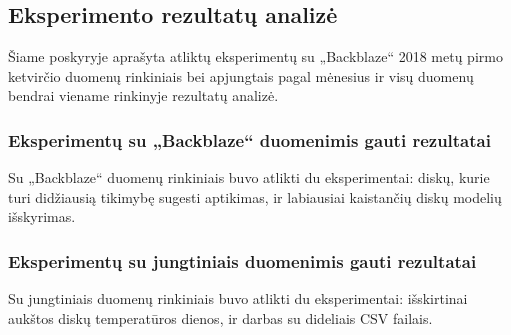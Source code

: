 \documentclass{VUMIFPSkursinis}
\begin{document}
\subsection{Eksperimento rezultatų analizė}
Šiame poskyryje aprašyta atliktų eksperimentų su „Backblaze“ 2018 metų pirmo ketvirčio duomenų rinkiniais bei apjungtais pagal mėnesius ir visų duomenų bendrai viename rinkinyje rezultatų analizė.

\subsubsection{Eksperimentų su „Backblaze“ duomenimis gauti rezultatai}
Su „Backblaze“ duomenų rinkiniais buvo atlikti du eksperimentai: diskų, kurie turi didžiausią tikimybę sugesti aptikimas, ir labiausiai kaistančių diskų modelių išskyrimas.



\subsubsection{Eksperimentų su jungtiniais duomenimis gauti rezultatai}
Su jungtiniais duomenų rinkiniais buvo atlikti du eksperimentai: išskirtinai aukštos diskų temperatūros dienos, ir darbas su dideliais CSV failais.




\appendix
\end{document}
